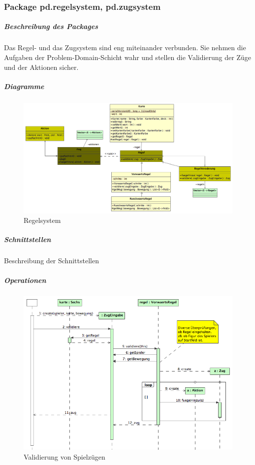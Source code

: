 \documentclass[a4paper,12pt,halfparskip,DIV12]{scrartcl}
\begin{document}
\subsubsection{Package pd.regelsystem, pd.zugsystem} %
\label{ssub:package_pd_regelsystem}
\subparagraph{Beschreibung des Packages} %
\label{ssub:beschreibung_des_packages}
Das Regel- und das Zugsystem sind eng miteinander verbunden. Sie nehmen die Aufgaben der Problem-Domain-Schicht wahr und stellen die Validierung der Züge und der Aktionen sicher.
\subparagraph{Diagramme} %
\label{ssub:diagramme}
\begin{figure}[h]
	\centering
	\includegraphics[width=\textwidth]{pd_regelsystem}
	\caption{Regelsystem}
	\label{fig:pd_regelsystem}
\end{figure}
\subparagraph{Schnittstellen} %
\label{ssub:schnittstellen}
Beschreibung der Schnittstellen
\subparagraph{Operationen} %
\label{ssub:operationen}
\begin{figure}
	\centering
	\includegraphics[width=\textwidth]{pd_validierung}
	\caption{Validierung von Spielzügen}
	\label{fig:pd_validierung}
\end{figure}
\end{document}
